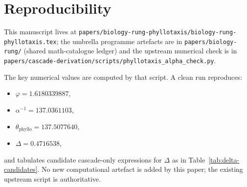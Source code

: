 \documentclass[12pt]{article}
\newcommand{\phig}{\varphi}
\begin{document}
\section{Reproducibility}\label{sec:repro}

This manuscript lives at
\texttt{papers/biology-rung-phyllotaxis/biology-rung-phyllotaxis.tex};
the umbrella programme artefacts are in
\texttt{papers/biology-rung/} (shared math-catalogue ledger) and the
upstream numerical check is in
\texttt{papers/cascade-derivation/scripts/phyllotaxis\_alpha\_check.py}.

The key numerical values are computed by that script. A clean run
reproduces:
\begin{itemize}
\item $\phig = 1.6180339887$,
\item $\alpha^{-1} = 137.0361103$,
\item $\theta_{\mathrm{phyllo}} = 137.5077640$,
\item $\Delta = 0.4716538$,
\end{itemize}
and tabulates candidate cascade-only expressions for $\Delta$ as in
Table~\ref{tab:delta-candidates}. No new computational artefact is
added by this paper; the existing upstream script is authoritative.
\end{document}
